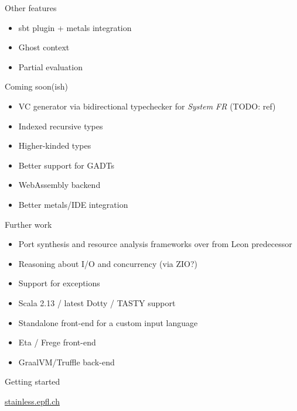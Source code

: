 \documentclass[
  ignorenonframetext,
]{beamer}
\providecommand{\tightlist}{%
  \setlength{\itemsep}{0pt}\setlength{\parskip}{0pt}}
\begin{document}
\begin{frame}{Other features}
\protect\hypertarget{other-features}{}

\begin{itemize}
\tightlist
\item
  sbt plugin + metals integration
\item
  Ghost context
\item
  Partial evaluation
\end{itemize}

\end{frame}

\begin{frame}{Coming soon(ish)}
\protect\hypertarget{coming-soonish}{}

\begin{itemize}
\tightlist
\item
  VC generator via bidirectional typechecker for \emph{System FR} (TODO:
  ref)
\item
  Indexed recursive types
\item
  Higher-kinded types
\item
  Better support for GADTs
\item
  WebAssembly backend
\item
  Better metals/IDE integration
\end{itemize}

\end{frame}

\begin{frame}{Further work}
\protect\hypertarget{further-work}{}

\begin{itemize}
\tightlist
\item
  Port synthesis and resource analysis frameworks over from Leon
  predecessor
\item
  Reasoning about I/O and concurrency (via ZIO?)
\item
  Support for exceptions
\item
  Scala 2.13 / latest Dotty / TASTY support
\item
  Standalone front-end for a custom input language
\item
  Eta / Frege front-end
\item
  GraalVM/Truffle back-end
\end{itemize}

\end{frame}

\begin{frame}{Getting started}
\protect\hypertarget{getting-started}{}

\href{https://stainless.epfl.ch}{stainless.epfl.ch}

\end{frame}
\end{document}
